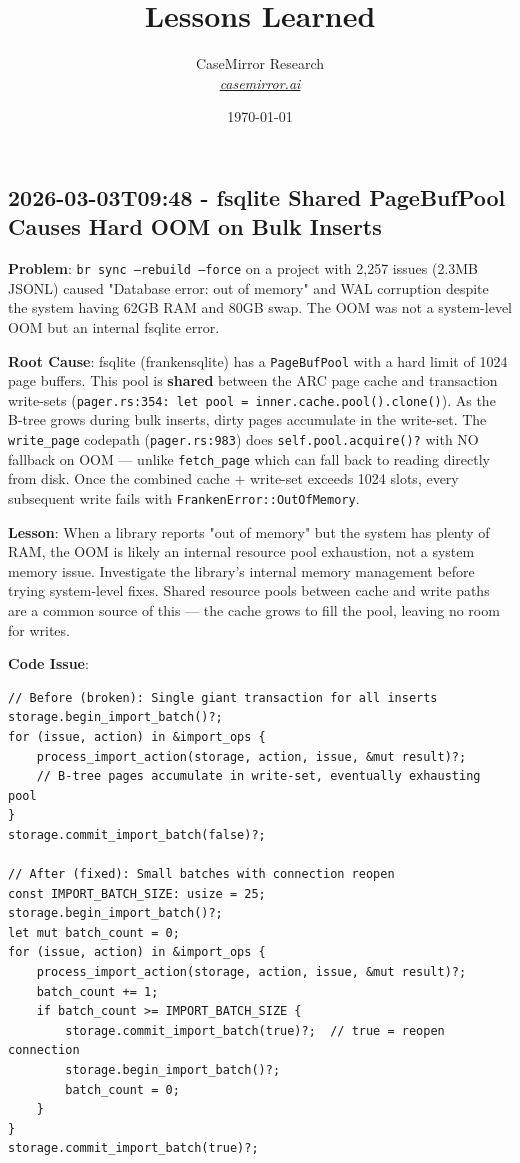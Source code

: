 \documentclass[twocolumn,10pt,letterpaper]{article}
\title{\vspace{-1.8em}\LARGE\bfseries\color{titlebg} Lessons Learned\vspace{-0.3em}}
\author{CaseMirror Research \\ \small\itshape\href{https://casemirror.ai}{\textcolor{headergray}{casemirror.ai}}}
\date{{\small\color{headergray} \today}}
\begin{document}
\raggedbottom
\sloppy

\maketitle
\thispagestyle{firstpage}
\vspace{-0.5em}


\subsection{2026-03-03T09:48 - fsqlite Shared PageBufPool Causes Hard OOM on Bulk Inserts}

\textbf{Problem}: \colorbox{codebg}{\texttt{br sync --rebuild --force}} on a project with 2,257 issues (2.3MB JSONL) caused "Database error: out of memory" and WAL corruption despite the system having 62GB RAM and 80GB swap. The OOM was not a system-level OOM but an internal fsqlite error.


\textbf{Root Cause}: fsqlite (frankensqlite) has a \colorbox{codebg}{\texttt{PageBufPool}} with a hard limit of 1024 page buffers. This pool is \textbf{shared} between the ARC page cache and transaction write-sets (\colorbox{codebg}{\texttt{pager.rs:354: let pool = inner.cache.pool().clone()}}). As the B-tree grows during bulk inserts, dirty pages accumulate in the write-set. The \colorbox{codebg}{\texttt{write\_page}} codepath (\colorbox{codebg}{\texttt{pager.rs:983}}) does \colorbox{codebg}{\texttt{self.pool.acquire()?}} with NO fallback on OOM — unlike \colorbox{codebg}{\texttt{fetch\_page}} which can fall back to reading directly from disk. Once the combined cache + write-set exceeds 1024 slots, every subsequent write fails with \colorbox{codebg}{\texttt{FrankenError::OutOfMemory}}.


\textbf{Lesson}: When a library reports "out of memory" but the system has plenty of RAM, the OOM is likely an internal resource pool exhaustion, not a system memory issue. Investigate the library's internal memory management before trying system-level fixes. Shared resource pools between cache and write paths are a common source of this — the cache grows to fill the pool, leaving no room for writes.


\textbf{Code Issue}:

\begin{lstlisting}
// Before (broken): Single giant transaction for all inserts
storage.begin_import_batch()?;
for (issue, action) in &import_ops {
    process_import_action(storage, action, issue, &mut result)?;
    // B-tree pages accumulate in write-set, eventually exhausting pool
}
storage.commit_import_batch(false)?;

// After (fixed): Small batches with connection reopen
const IMPORT_BATCH_SIZE: usize = 25;
storage.begin_import_batch()?;
let mut batch_count = 0;
for (issue, action) in &import_ops {
    process_import_action(storage, action, issue, &mut result)?;
    batch_count += 1;
    if batch_count >= IMPORT_BATCH_SIZE {
        storage.commit_import_batch(true)?;  // true = reopen connection
        storage.begin_import_batch()?;
        batch_count = 0;
    }
}
storage.commit_import_batch(true)?;
\end{lstlisting}
\end{document}
